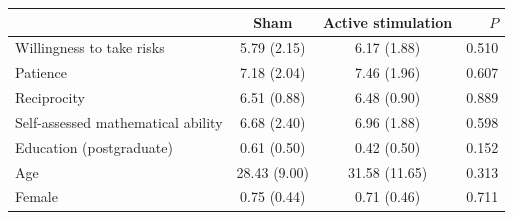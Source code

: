 \small
\begin{tabular}{lccr}
\toprule
& Sham & Active stimulation & $P$ \\
\midrule
Willingness to take risks & 5.79 (2.15) & 6.17 (1.88) & 0.510 \\
Patience & 7.18 (2.04) & 7.46 (1.96) & 0.607 \\
Reciprocity & 6.51 (0.88) & 6.48 (0.90) & 0.889 \\
Self-assessed mathematical ability & 6.68 (2.40) & 6.96 (1.88) & 0.598 \\
Education (postgraduate) & 0.61 (0.50) & 0.42 (0.50) & 0.152 \\
Age & 28.43 (9.00) & 31.58 (11.65) & 0.313 \\
Female & 0.75 (0.44) & 0.71 (0.46) & 0.711 \\
\bottomrule
\end{tabular}
